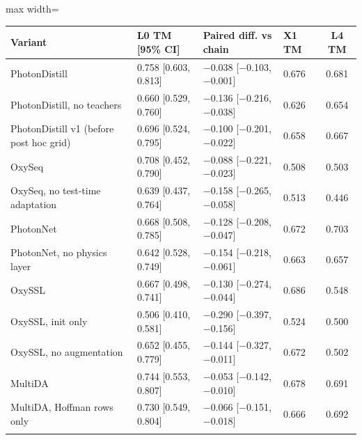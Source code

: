 {\footnotesize
\setlength{\tabcolsep}{4pt}
\begin{adjustbox}{max width=\linewidth}
\begin{tabular}{p{4.2cm}lllc}
\toprule
Variant & L0 TM [95\% CI] & Paired diff. vs chain & X1 TM & L4 TM \\
\midrule
PhotonDistill & 0.758 [0.603, 0.813] & $-$0.038 [$-$0.103, $-$0.001] & 0.676 & 0.681 \\
PhotonDistill, no teachers & 0.660 [0.529, 0.760] & $-$0.136 [$-$0.216, $-$0.038] & 0.626 & 0.654 \\
PhotonDistill v1 (before post hoc grid) & 0.696 [0.524, 0.795] & $-$0.100 [$-$0.201, $-$0.022] & 0.658 & 0.667 \\
\addlinespace
OxySeq & 0.708 [0.452, 0.790] & $-$0.088 [$-$0.221, $-$0.023] & 0.508 & 0.503 \\
OxySeq, no test-time adaptation & 0.639 [0.437, 0.764] & $-$0.158 [$-$0.265, $-$0.058] & 0.513 & 0.446 \\
\addlinespace
PhotonNet & 0.668 [0.508, 0.785] & $-$0.128 [$-$0.208, $-$0.047] & 0.672 & 0.703 \\
PhotonNet, no physics layer & 0.642 [0.528, 0.749] & $-$0.154 [$-$0.218, $-$0.061] & 0.663 & 0.657 \\
\addlinespace
OxySSL & 0.667 [0.498, 0.741] & $-$0.130 [$-$0.274, $-$0.044] & 0.686 & 0.548 \\
OxySSL, init only & 0.506 [0.410, 0.581] & $-$0.290 [$-$0.397, $-$0.156] & 0.524 & 0.500 \\
OxySSL, no augmentation & 0.652 [0.455, 0.779] & $-$0.144 [$-$0.327, $-$0.011] & 0.672 & 0.502 \\
\addlinespace
MultiDA & 0.744 [0.553, 0.807] & $-$0.053 [$-$0.142, $-$0.010] & 0.678 & 0.691 \\
MultiDA, Hoffman rows only & 0.730 [0.549, 0.804] & $-$0.066 [$-$0.151, $-$0.018] & 0.666 & 0.692 \\
\addlinespace
\bottomrule
\end{tabular}
\end{adjustbox}
}
